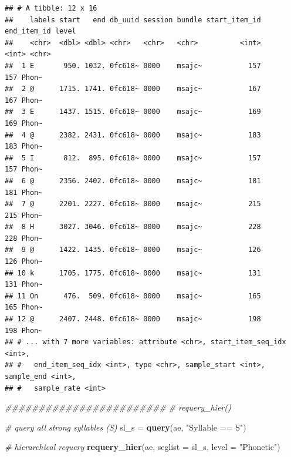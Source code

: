 \documentclass[]{book}
\newenvironment{Shaded}{\begin{snugshade}}{\end{snugshade}}
\newcommand{\CommentTok}[1]{\textcolor[rgb]{0.56,0.35,0.01}{\textit{#1}}}
\newcommand{\DataTypeTok}[1]{\textcolor[rgb]{0.13,0.29,0.53}{#1}}
\newcommand{\KeywordTok}[1]{\textcolor[rgb]{0.13,0.29,0.53}{\textbf{#1}}}
\newcommand{\NormalTok}[1]{#1}
\newcommand{\StringTok}[1]{\textcolor[rgb]{0.31,0.60,0.02}{#1}}
\begin{document}
\begin{verbatim}
## # A tibble: 12 x 16
##    labels start   end db_uuid session bundle start_item_id end_item_id level
##    <chr>  <dbl> <dbl> <chr>   <chr>   <chr>          <int>       <int> <chr>
##  1 E       950. 1032. 0fc618~ 0000    msajc~           157         157 Phon~
##  2 @      1715. 1741. 0fc618~ 0000    msajc~           167         167 Phon~
##  3 E      1437. 1515. 0fc618~ 0000    msajc~           169         169 Phon~
##  4 @      2382. 2431. 0fc618~ 0000    msajc~           183         183 Phon~
##  5 I       812.  895. 0fc618~ 0000    msajc~           157         157 Phon~
##  6 @      2356. 2402. 0fc618~ 0000    msajc~           181         181 Phon~
##  7 @      2201. 2227. 0fc618~ 0000    msajc~           215         215 Phon~
##  8 H      3027. 3046. 0fc618~ 0000    msajc~           228         228 Phon~
##  9 @      1422. 1435. 0fc618~ 0000    msajc~           126         126 Phon~
## 10 k      1705. 1775. 0fc618~ 0000    msajc~           131         131 Phon~
## 11 On      476.  509. 0fc618~ 0000    msajc~           165         165 Phon~
## 12 @      2407. 2448. 0fc618~ 0000    msajc~           198         198 Phon~
## # ... with 7 more variables: attribute <chr>, start_item_seq_idx <int>,
## #   end_item_seq_idx <int>, type <chr>, sample_start <int>, sample_end <int>,
## #   sample_rate <int>
\end{verbatim}

\begin{Shaded}
\begin{Highlighting}[]
\CommentTok{########################}
\CommentTok{# requery_hier()}

\CommentTok{# query all strong syllables (S)}
\NormalTok{sl_s =}\StringTok{ }\KeywordTok{query}\NormalTok{(ae, }\StringTok{"Syllable == S"}\NormalTok{)}

\CommentTok{# hierarchical requery}
\KeywordTok{requery_hier}\NormalTok{(ae, }
             \DataTypeTok{seglist =}\NormalTok{ sl_s,}
             \DataTypeTok{level =} \StringTok{"Phonetic"}\NormalTok{)}
\end{Highlighting}
\end{Shaded}
\end{document}
